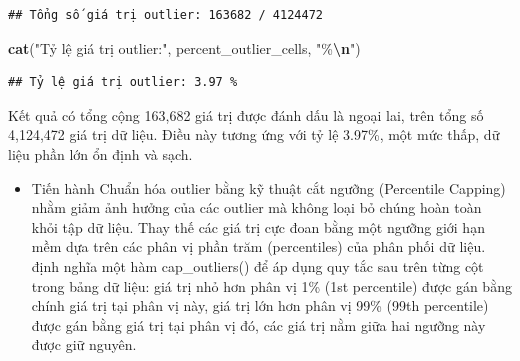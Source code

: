 \documentclass[
]{article}
\newenvironment{Shaded}{\begin{snugshade}}{\end{snugshade}}
\newcommand{\FunctionTok}[1]{\textcolor[rgb]{0.13,0.29,0.53}{\textbf{#1}}}
\newcommand{\NormalTok}[1]{#1}
\newcommand{\SpecialCharTok}[1]{\textcolor[rgb]{0.81,0.36,0.00}{\textbf{#1}}}
\newcommand{\StringTok}[1]{\textcolor[rgb]{0.31,0.60,0.02}{#1}}
\providecommand{\tightlist}{%
  \setlength{\itemsep}{0pt}\setlength{\parskip}{0pt}}
\begin{document}
\begin{verbatim}
## Tổng số giá trị outlier: 163682 / 4124472
\end{verbatim}

\begin{Shaded}
\begin{Highlighting}[]
\FunctionTok{cat}\NormalTok{(}\StringTok{"Tỷ lệ giá trị outlier:"}\NormalTok{, percent\_outlier\_cells, }\StringTok{"\%}\SpecialCharTok{\textbackslash{}n}\StringTok{"}\NormalTok{)}
\end{Highlighting}
\end{Shaded}

\begin{verbatim}
## Tỷ lệ giá trị outlier: 3.97 %
\end{verbatim}

Kết quả có tổng cộng 163,682 giá trị được đánh dấu là ngoại lai, trên
tổng số 4,124,472 giá trị dữ liệu. Điều này tương ứng với tỷ lệ 3.97\%,
một mức thấp, dữ liệu phần lớn ổn định và sạch.

\begin{itemize}
\tightlist
\item
  Tiến hành Chuẩn hóa outlier bằng kỹ thuật cắt ngưỡng (Percentile
  Capping) nhằm giảm ảnh hưởng của các outlier mà không loại bỏ chúng
  hoàn toàn khỏi tập dữ liệu. Thay thế các giá trị cực đoan bằng một
  ngưỡng giới hạn mềm dựa trên các phân vị phần trăm (percentiles) của
  phân phối dữ liệu. định nghĩa một hàm cap\_outliers() để áp dụng quy
  tắc sau trên từng cột trong bảng dữ liệu: giá trị nhỏ hơn phân vị 1\%
  (1st percentile) được gán bằng chính giá trị tại phân vị này, giá trị
  lớn hơn phân vị 99\% (99th percentile) được gán bằng giá trị tại phân
  vị đó, các giá trị nằm giữa hai ngưỡng này được giữ nguyên.
\end{itemize}
\end{document}
